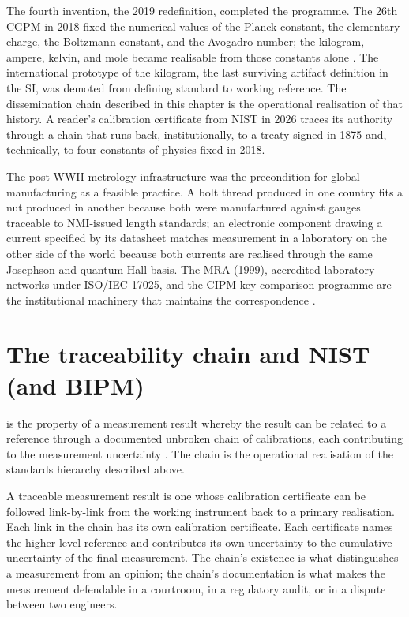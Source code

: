 The fourth invention, the 2019 redefinition, completed the
programme. The 26th CGPM in 2018 fixed the numerical values of the
Planck constant, the elementary charge, the Boltzmann constant, and
the Avogadro number; the kilogram, ampere, kelvin, and mole became
realisable from those constants alone \cite{std:bipm-si2019}. The
international prototype of the kilogram, the last surviving artifact
definition in the SI, was demoted from defining standard to working
reference. The dissemination chain described in this chapter is the
operational realisation of that history. A reader's calibration
certificate from NIST in 2026 traces its authority through a chain
that runs back, institutionally, to a treaty signed in 1875 and,
technically, to four constants of physics fixed in 2018.

The post-WWII metrology infrastructure was the precondition for
global manufacturing as a feasible practice. A bolt thread produced
in one country fits a nut produced in another because both were
manufactured against gauges traceable to NMI-issued length
standards; an electronic component drawing a current specified by
its datasheet matches measurement in a laboratory on the other side
of the world because both currents are realised through the same
Josephson-and-quantum-Hall basis. The MRA (1999), accredited
laboratory networks under ISO/IEC 17025, and the CIPM key-comparison
programme are the institutional machinery that maintains the
correspondence \cite{std:bipm-cipm-mra, std:iso-iec-17025}.

\section{The traceability chain and NIST (and BIPM)}

 is the property of a measurement
result whereby the result can be related to a reference through a
documented unbroken chain of calibrations, each contributing to the
measurement uncertainty \cite{std:jcgm-vim, std:nist-traceability}.
The chain is the operational realisation of the standards hierarchy
described above.

A traceable measurement result is one whose calibration certificate
can be followed link-by-link from the working instrument back to a
primary realisation. Each link in the chain has its own calibration
certificate. Each certificate names the higher-level reference and
contributes its own uncertainty to the cumulative uncertainty of the
final measurement. The chain's existence is what distinguishes a
measurement from an opinion; the chain's documentation is what
makes the measurement defendable in a courtroom, in a regulatory
audit, or in a dispute between two engineers.

